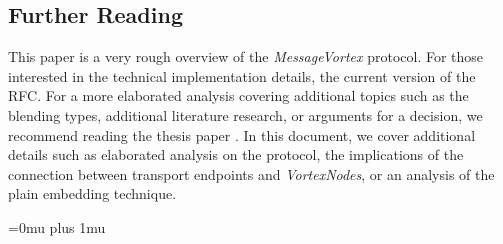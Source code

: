 \documentclass[acmsmall, screen]{acmart}
\begin{document}
\subsection{Further Reading}
This paper is a very rough overview of the \emph{MessageVortex} protocol. For those interested in the technical implementation details, the current version of the RFC\cite{MessageVortexRFC}. For a more elaborated analysis covering additional topics such as the blending types, additional literature research, or arguments for a decision, we recommend reading the thesis paper \cite{messageVortex}. In this document, we cover additional details such as elaborated analysis on the protocol, the implications of the connection between transport endpoints and \emph{VortexNodes}, or an analysis of the plain embedding technique.



\Urlmuskip=0mu plus 1mu %

\end{document}
